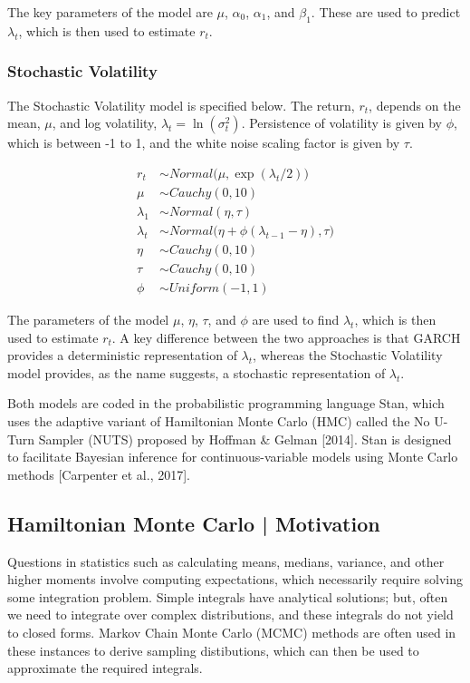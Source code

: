 \documentclass[12pt,letterpaper,reqno,fleqn]{article}
\begin{document}
The key parameters of the model are $\mu$, $\alpha_0$, $\alpha_1$, and $\beta_1$. These are used to predict $\lambda_t$, which is then used to estimate $r_t$. 

\subsubsection{Stochastic Volatility}
The Stochastic Volatility model is specified below. The return, $r_t$, depends on the mean, $\mu$, and log volatility, $\lambda_t = \ln(\sigma^2_t)$. Persistence of volatility is given by $\phi$, which is between -1 to 1, and the white noise scaling factor is given by $\tau$.

\begin{align}
r_t &\sim Normal\bigl(\mu, \exp({\lambda_t/2})\bigr) \\
\mu &\sim Cauchy(0, 10) \\
\lambda_1 &\sim Normal(\eta, \tau) \\
\lambda_t &\sim Normal\bigl(\eta + \phi(\lambda_{t-1} - \eta), \tau\bigr) \\
\eta &\sim Cauchy(0, 10) \\
\tau &\sim Cauchy(0, 10) \\
\phi &\sim Uniform(-1, 1)
\end{align}

The parameters of the model $\mu$, $\eta$, $\tau$, and $\phi$ are used to find $\lambda_t$, which is then used to estimate $r_t$. A key difference between the two approaches is that GARCH provides a deterministic representation of $\lambda_t$, whereas the Stochastic Volatility model provides, as the name suggests, a stochastic representation of $\lambda_t$.

Both models are coded in the probabilistic programming language Stan, which uses the adaptive variant of Hamiltonian Monte Carlo (HMC) called the No U-Turn Sampler (NUTS) proposed by Hoffman \& Gelman [2014]. Stan is designed to facilitate Bayesian inference for continuous-variable models using Monte Carlo methods [Carpenter et al., 2017].

\subsection{Hamiltonian Monte Carlo | Motivation}
Questions in statistics such as calculating means, medians, variance, and other higher moments involve computing expectations, which necessarily require solving some integration problem. Simple integrals have analytical solutions; but, often we need to integrate over complex distributions, and these integrals do not yield to closed forms. Markov Chain Monte Carlo (MCMC) methods are often used in these instances to derive sampling distibutions, which can then be used to approximate the required integrals.
\end{document}
